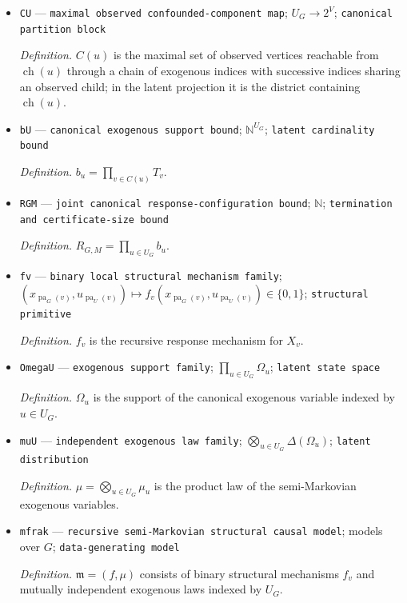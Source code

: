 \documentclass{article}
\begin{document}
\begin{itemize}
  \item \texttt{CU} --- \texttt{maximal observed confounded-\allowbreak{}component map}; \(U_G\to 2^V\); \texttt{canonical partition block}
  \par\smallskip\noindent\emph{Definition.} \(C(u)\) is the maximal set of observed vertices reachable from \(\operatorname{ch}(u)\) through a chain of exogenous indices with successive indices sharing an observed child; in the latent projection it is the district containing \(\operatorname{ch}(u)\).
  \item \texttt{bU} --- \texttt{canonical exogenous support bound}; \(\mathbb N^{U_G}\); \texttt{latent cardinality bound}
  \par\smallskip\noindent\emph{Definition.} \(b_u=\prod_{v\in C(u)}T_v\).
  \item \texttt{RGM} --- \texttt{joint canonical response-\allowbreak{}configuration bound}; \(\mathbb N\); \texttt{termination and certificate-\allowbreak{}size bound}
  \par\smallskip\noindent\emph{Definition.} \(R_{G,M}=\prod_{u\in U_G}b_u\).
  \item \texttt{fv} --- \texttt{binary local structural mechanism family}; \((x_{\operatorname{pa}_G(v)},u_{\operatorname{pa}_U(v)})\mapsto f_v(x_{\operatorname{pa}_G(v)},u_{\operatorname{pa}_U(v)})\in\{0,1\}\); \texttt{structural primitive}
  \par\smallskip\noindent\emph{Definition.} \(f_v\) is the recursive response mechanism for \(X_v\).
  \item \texttt{OmegaU} --- \texttt{exogenous support family}; \(\prod_{u\in U_G}\Omega_u\); \texttt{latent state space}
  \par\smallskip\noindent\emph{Definition.} \(\Omega_u\) is the support of the canonical exogenous variable indexed by \(u\in U_G\).
  \item \texttt{muU} --- \texttt{independent exogenous law family}; \(\bigotimes_{u\in U_G}\Delta(\Omega_u)\); \texttt{latent distribution}
  \par\smallskip\noindent\emph{Definition.} \(\mu=\bigotimes_{u\in U_G}\mu_u\) is the product law of the semi-Markovian exogenous variables.
  \item \texttt{mfrak} --- \texttt{recursive semi-\allowbreak{}Markovian structural causal model}; models over \(G\); \texttt{data-\allowbreak{}generating model}
  \par\smallskip\noindent\emph{Definition.} \(\mathfrak m=(f,\mu)\) consists of binary structural mechanisms \(f_v\) and mutually independent exogenous laws indexed by \(U_G\).

\end{itemize}
\end{document}
